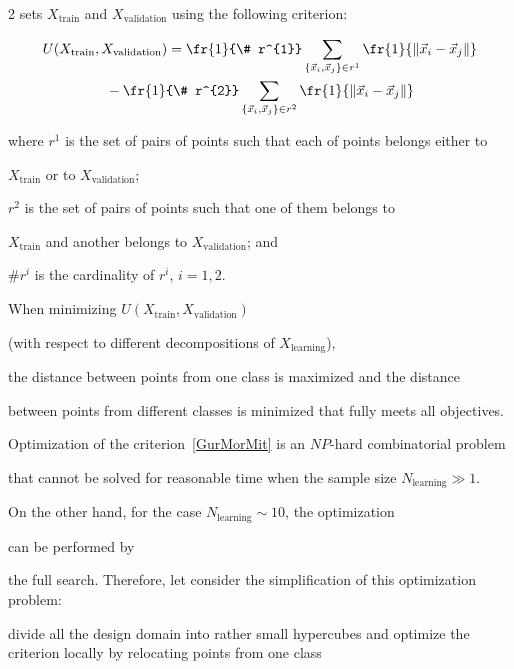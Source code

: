 \begin{multicols}{2}
sets $X_{\mathrm{train}}$ and $X_{\mathrm{validation}}$ using the following criterion:

\begin{multline}

  \label{GurMorMit}

   U(X_{\mathrm{train}}, X_{\mathrm{validation}}) = 

   \fr{1}{\# r^{1}}\sum\limits_{ \{\vec x_i, \vec x_j\} \in r^{1}} 

   \fr{1}{\| \vec x_i - \vec x_j\|}\\

   {} - \fr{1}{\# r^{2}}

   \sum\limits_{ \{\vec x_i, \vec x_j\} \in r^{2}} \fr{1}{\|\vec x_i - \vec x_j\|}

\end{multline}

where $r^{1}$ is the set of pairs of points such that each of points belongs either to

 $X_{\mathrm{train}}$ or to $X_{\mathrm{validation}}$;

  $r^{2}$ is the set of pairs of points such that one of them belongs to

 $X_{\mathrm{train}}$ and another belongs to $X_{\mathrm{validation}}$; and

  $\# r^{i}$ is the cardinality of $r^{i}$, $i = 1, 2$.

  When minimizing  $U(X_{\mathrm{train}}, X_{\mathrm{validation}})$ 

  (with respect to different decompositions of $X_{\mathrm{learning}}$), 

  the distance between points from one class is maximized and the distance 

  between points from different classes is minimized that fully meets all objectives.



Optimization of the criterion~\eqref{GurMorMit} is an $NP$-hard combinatorial problem

that cannot be solved for reasonable time when the sample size $N_{\mathrm{learning}} \gg 1$. 

On the other hand, for the case $N_{\mathrm{learning}} \sim 10$, the optimization 

can be performed by 

the full search. Therefore, let consider the simplification of this optimization problem:

divide all the design domain into rather small hypercubes and optimize the criterion locally by relocating points from one class


\end{multicols}
